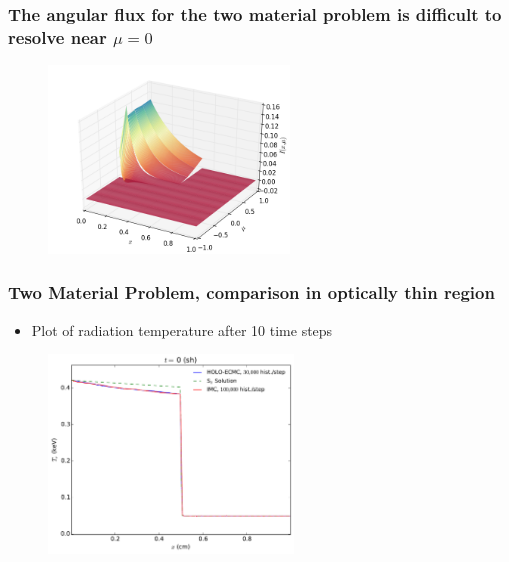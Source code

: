 \documentclass[xcolor=dvipsnames,hyperref={pdfpagelabels=false},unknownkeysallowed,
handout]{beamer}
\newlength{\wideitemsep}
\let\olditem\item
\renewcommand{\item}{\setlength{\itemsep}{\wideitemsep}\olditem}
\begin{document}
\begin{frame}   
    \frametitle{The angular flux for the two material problem is difficult to resolve near
    $\mu=0$}
    \begin{figure}
        \includegraphics[width=0.57\textwidth]{ang_flux.png}
    \end{figure}
\end{frame}

\begin{frame}
    \frametitle{Two Material Problem, comparison in optically thin region}
    \begin{block}{}
        \begin{itemize}
            \item Plot of radiation temperature after 10 time steps
        \end{itemize}
    \end{block}
\begin{figure}
    \centering
    \includegraphics[width=0.5799\textwidth]{quick_compare.pdf}
\end{figure}

\end{frame}
\end{document}
